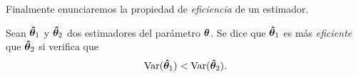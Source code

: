\documentclass[oneside,openright,titlepage,numbers=noenddot,openany,headinclude,footinclude=true,
cleardoublepage=empty,abstractoff,BCOR=5mm,paper=a4,fontsize=12pt,main=spanish]{scrreprt}
\begin{document}

Finalmente enunciaremos la propiedad de \textit{eficiencia} de un estimador.\\

\begin{definition} \label{def:efvar}
Sean $\bm{\hat{\theta}}_1$ y $\bm{\hat{\theta}}_2$ dos estimadores del parámetro $\bm{\theta}$. Se dice que $\bm{\hat{\theta}}_1$ es más \textit{eficiente} que $\bm{\hat{\theta}}_2$ si verifica que $$\text{Var}(\bm{\hat{\theta}}_1)<\text{Var}(\bm{\hat{\theta}}_2).$$
\end{definition}\

\end{document}
